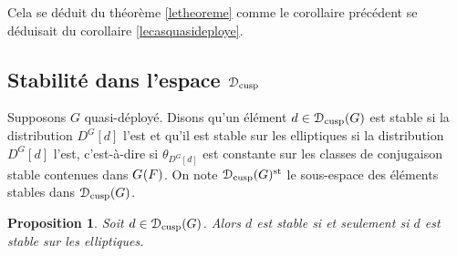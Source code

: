 \documentclass[11pt]{article}
\numberwithin{equation}{section}\providecommand{\og}{«\,}\providecommand{\fg}{\,»}
\let\mathcal \EuScript
\newcommand{\NoChangel}[1]{%
\expandafter\let\csname old\string#1\endcsname=#1
\let#1=\relax
\newcommand{#1}{\mathcode`l="716C\csname old\string#1\endcsname\mathcode`l="7160 }%
}
\newcommand{\cusp}{\mathrm{cusp}}
\newcommand{\rell}{\mathrm{ell}} \NoChangel{\rell}
\newcommand{\st}{\mathrm{st}}
\newcommand{\cD}{\mathcal{D}}
\theoremstyle{plain}
\newtheorem*{prop*}{Proposition}
\theoremstyle{definition}
\begin{document}
Cela se déduit du théorème \ref{letheoreme} comme le corollaire précédent se déduisait du corollaire \ref{lecasquasideploye}.

\subsection{Stabilité dans l'espace \texorpdfstring{$\cD_{\cusp}$}{Dcusp}}\label{stabilite}
Supposons $G$ quasi-déployé. Disons qu'un élément $d\in \cD_{\cusp}(G)$ est stable si la distribution $D^G[d]$ l'est et qu'il est stable sur les elliptiques si la distribution $D^G[d]$ l'est, c'est-à-dire si $\theta_{D^G[d]}$ est constante sur les classes de conjugaison stable contenues dans $G_{\rell}(F)$. On note $\cD_{\cusp}(G)^{\st}$ le sous-espace des éléments stables dans $\cD_{\cusp}(G)$.

\begin{prop*}
Soit $d\in \cD_{\cusp}(G)$. Alors $d$ est stable si et seulement si $d$ est stable sur les elliptiques.
\end{prop*}
\end{document}
